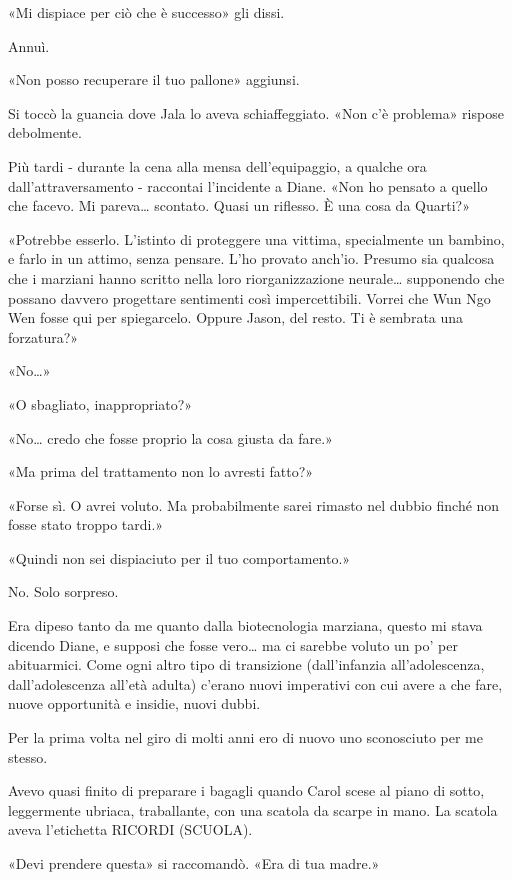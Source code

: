 «Mi dispiace per ciò che è successo» gli dissi.

Annuì.

«Non posso recuperare il tuo pallone» aggiunsi.

Si toccò la guancia dove Jala lo aveva schiaffeggiato. «Non c'è
problema» rispose debolmente.

Più tardi - durante la cena alla mensa dell'equipaggio, a qualche ora
dall'attraversamento - raccontai l'incidente a Diane. «Non ho pensato a
quello che facevo. Mi pareva\ldots{} scontato. Quasi un riflesso. È una
cosa da Quarti?»

«Potrebbe esserlo. L'istinto di proteggere una vittima, specialmente un
bambino, e farlo in un attimo, senza pensare. L'ho provato anch'io.
Presumo sia qualcosa che i marziani hanno scritto nella loro
riorganizzazione neurale\ldots{} supponendo che possano davvero
progettare sentimenti così impercettibili. Vorrei che Wun Ngo Wen fosse
qui per spiegarcelo. Oppure Jason, del resto. Ti è sembrata una
forzatura?»

«No\ldots»

«O sbagliato, inappropriato?»

«No\ldots{} credo che fosse proprio la cosa giusta da fare.»

«Ma prima del trattamento non lo avresti fatto?»

«Forse sì. O avrei voluto. Ma probabilmente sarei rimasto nel dubbio
finché non fosse stato troppo tardi.»

«Quindi non sei dispiaciuto per il tuo comportamento.»

No. Solo sorpreso.

Era dipeso tanto da me quanto dalla biotecnologia marziana, questo mi
stava dicendo Diane, e supposi che fosse vero\ldots{} ma ci sarebbe
voluto un po' per abituarmici. Come ogni altro tipo di transizione
(dall'infanzia all'adolescenza, dall'adolescenza all'età adulta) c'erano
nuovi imperativi con cui avere a che fare, nuove opportunità e insidie,
nuovi dubbi.

Per la prima volta nel giro di molti anni ero di nuovo uno sconosciuto
per me stesso.

\separatorefiori

Avevo quasi finito di preparare i bagagli quando Carol scese al piano di
sotto, leggermente ubriaca, traballante, con una scatola da scarpe in
mano. La scatola aveva l'etichetta {RICORDI} ({SCUOLA}).

«Devi prendere questa» si raccomandò. «Era di tua madre.»

